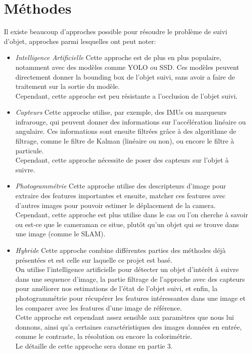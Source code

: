 \section{Méthodes}
Il existe beaucoup d'approches possible pour résoudre le problème de suivi d'objet, approches parmi lesquelles ont peut noter:
\begin{itemize}
	\item \textit{Intelligence Artificielle}\newline
	Cette approche est de plus en plus populaire, notamment avec des modèles comme YOLO\cite{redmon_you_2016} ou SSD\cite{liu_ssd_2016}. Ces modèles peuvent directement donner la bounding box de l'objet suivi, sans avoir a faire de traitement sur la sortie du modèle.\\
	Cependant, cette approche est peu résistante a l'occlusion de l'objet suivi.\\
	
	\item \textit{Capteurs}\newline
	Cette approche utilise, par exemple, des IMUs ou marqueurs infrarouge, qui peuvent donner des informations sur l'accélération linéaire ou angulaire. Ces informations sont ensuite filtrées grâce à des algorithme de filtrage, comme le filtre de Kalman (linéaire ou non), ou encore le filtre à particule.\\
	Cependant, cette approche nécessite de poser des capteurs sur l'objet à suivre.\\
	
	\item \textit{Photogrammétrie}\newline
	Cette approche utilise des descripteurs d'image pour extraire des features importantes et ensuite, matcher ces features avec d'autres images pour pouvoir estimer le déplacement de la camera.\\
	Cependant, cette approche est plus utilise dans le cas ou l'on cherche à savoir ou est-ce que le cameraman ce situe, plutôt qu'un objet qui se trouve dans une image (comme le SLAM).\\
	
	\item \textit{Hybride}\newline
	Cette approche combine différentes parties des méthodes déjà présentées et est celle sur laquelle ce projet est basé.\\
	On utilise l'intelligence artificielle pour détecter un objet d'intérêt à suivre dans une sequence d'image, la partie filtrage de l'approche avec des capteurs pour améliorer nos estimations de l'état de l'objet suivi, et enfin, la photogrammétrie pour récupérer les features intéressantes dans une image et les comparer avec les features d'une image de référence.\\
	Cette approche est cependant assez sensible aux paramètres que nous lui donnons, ainsi qu'a certaines caractéristiques des images données en entrée, comme le contraste, la résolution ou encore la colorimétrie.\\
	Le détaille de cette approche sera donne en partie 3.\\
\end{itemize}
